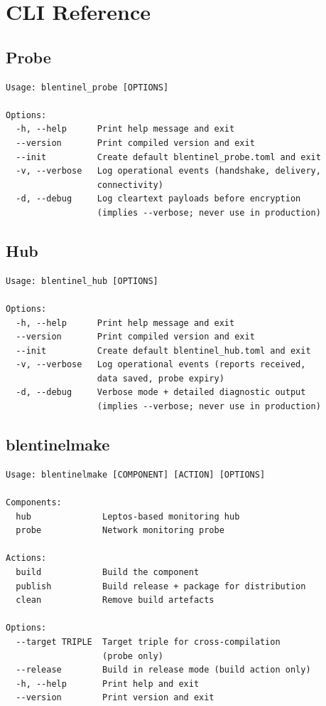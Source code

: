 \documentclass[12pt]{report}
\begin{document}
\section{CLI Reference}

\subsection{Probe}

\begin{lstlisting}
Usage: blentinel_probe [OPTIONS]

Options:
  -h, --help      Print help message and exit
  --version       Print compiled version and exit
  --init          Create default blentinel_probe.toml and exit
  -v, --verbose   Log operational events (handshake, delivery,
                  connectivity)
  -d, --debug     Log cleartext payloads before encryption
                  (implies --verbose; never use in production)
\end{lstlisting}

\subsection{Hub}

\begin{lstlisting}
Usage: blentinel_hub [OPTIONS]

Options:
  -h, --help      Print help message and exit
  --version       Print compiled version and exit
  --init          Create default blentinel_hub.toml and exit
  -v, --verbose   Log operational events (reports received,
                  data saved, probe expiry)
  -d, --debug     Verbose mode + detailed diagnostic output
                  (implies --verbose; never use in production)
\end{lstlisting}

\subsection{blentinelmake}

\begin{lstlisting}
Usage: blentinelmake [COMPONENT] [ACTION] [OPTIONS]

Components:
  hub              Leptos-based monitoring hub
  probe            Network monitoring probe

Actions:
  build            Build the component
  publish          Build release + package for distribution
  clean            Remove build artefacts

Options:
  --target TRIPLE  Target triple for cross-compilation
                   (probe only)
  --release        Build in release mode (build action only)
  -h, --help       Print help and exit
  --version        Print version and exit
\end{lstlisting}
\end{document}
